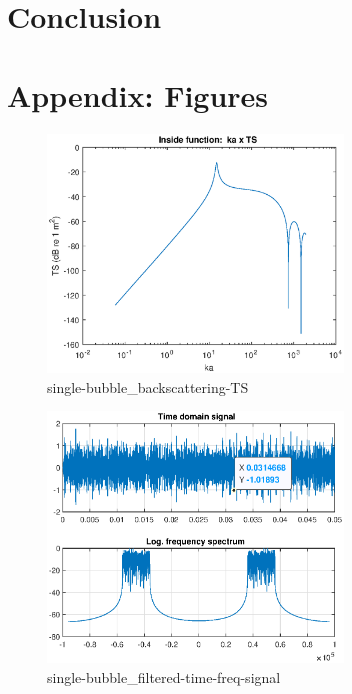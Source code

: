 \documentclass[11pt]{article}
\begin{document}
\section{Conclusion}

%
%
%
%

\section*{Appendix: Figures}
\begin{figure} [H] 
    \centering
    \includegraphics[width=0.7\textwidth]{figures/single-bubble_backscattering-TS.eps}
    \caption{single-bubble_backscattering-TS}
    \label{fig:single-bubble_backscattering-TS}
\end{figure}

\begin{figure} [H]
    \centering
    \includegraphics[width=0.7\textwidth]{figures/single-bubble_filtered-time-freq-signal.eps}
    \caption{single-bubble_filtered-time-freq-signal}
    \label{fig:single-bubble_filtered-time-freq-signal}
\end{figure}
\end{document}
